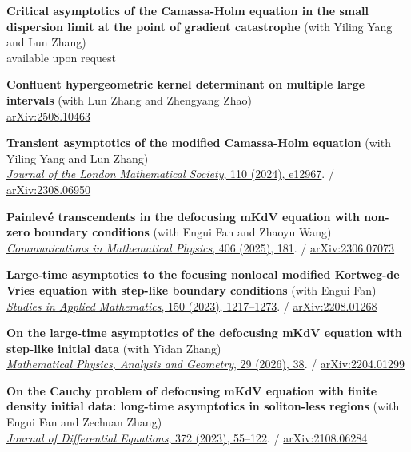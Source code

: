 \documentclass[12pt,a4paper]{article}
\begin{document}
\begin{cv}{}
\begin{etaremune}
    \item \textbf{Critical asymptotics of the Camassa-Holm equation in the small dispersion limit at the point of gradient catastrophe} (with Yiling Yang and Lun Zhang)\\
    available upon request

    \item \textbf{Confluent hypergeometric kernel determinant on multiple large intervals} (with Lun Zhang and Zhengyang Zhao)\\
    \href{https://arxiv.org/abs/2508.10463}{arXiv:2508.10463}

    \item \textbf{Transient asymptotics of the modified Camassa-Holm equation} (with Yiling Yang and Lun Zhang) \\
    \href{https://londmathsoc.onlinelibrary.wiley.com/doi/10.1112/jlms.12967}{{\sl Journal of the London Mathematical Society}, 110 (2024), e12967}. / \href{https://arxiv.org/abs/2308.06950}{arXiv:2308.06950}

    \item \textbf{Painlev\'{e} transcendents in the defocusing mKdV equation with non-zero boundary conditions} (with Engui Fan and Zhaoyu Wang)\\
    \href{https://link.springer.com/article/10.1007/s00220-025-05362-x}{{\sl Communications in Mathematical Physics}, 406 (2025), 181}. / \href{https://arxiv.org/abs/2306.07073}{arXiv:2306.07073}

    \item \textbf{Large-time asymptotics to the focusing nonlocal modified Kortweg-de Vries equation with step-like boundary conditions} (with Engui Fan)\\
    \href{https://onlinelibrary.wiley.com/doi/10.1111/sapm.12568}{{\sl Studies in Applied Mathematics}, 150 (2023), 1217--1273}. / \href{https://arxiv.org/abs/2208.01268}{arXiv:2208.01268}

    \item \textbf{On the large-time asymptotics of the defocusing mKdV equation with step-like initial data} (with Yidan Zhang)\\
    \href{https://doi.org/10.1007/s11040-026-09579-7}{{\sl Mathematical Physics, Analysis and Geometry}, 29 (2026), 38}. / \href{https://arxiv.org/abs/2204.01299}{arXiv:2204.01299}

    \item \textbf{On the Cauchy problem of defocusing mKdV equation with finite density initial data: long-time asymptotics in soliton-less regions} (with Engui Fan and Zechuan Zhang)\\
    \href{https://www.sciencedirect.com/science/article/pii/S002203962300445X?via%3Dihub}{{\sl Journal of Differential Equations}, 372 (2023), 55--122}. / \href{https://arxiv.org/abs/2108.06284}{arXiv:2108.06284}


\end{etaremune}
\end{cv}
\end{document}
